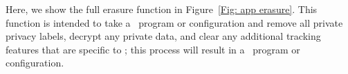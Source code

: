 



Here, we show the full erasure function in Figure~\ref{Fig: app erasure}. 
This function is intended to take a \piccoC\ program or configuration and remove all private privacy labels, decrypt any private data, and clear any additional tracking features that are specific to \piccoC; this process will result in a \vanillaC\ program or configuration. 




